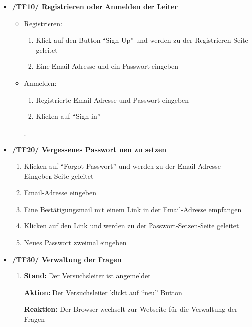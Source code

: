 \documentclass[a4paper]{scrreprt}
\begin{document}
            \begin{itemize}
                \item \textbf{/TF10/ Registrieren oder Anmelden der Leiter}
	                \begin{itemize}
	                	\item Registrieren:
		                	\begin{enumerate}
			                	\item Klick auf den Button ``Sign Up'' und werden zu der Registrieren-Seite geleitet
			                	\item Eine Email-Adresse und ein Passwort eingeben
			                \end{enumerate}
	                	\item Anmelden:
		                	\begin{enumerate}
		                		\item Registrierte Email-Adresse und Passwort eingeben
		                		\item Klicken auf ``Sign in''
		                	\end{enumerate}.
	                \end{itemize}

                \item \textbf{/TF20/ Vergessenes Passwort neu zu setzen}
	                \begin{enumerate}
	                	\item Klicken auf ``Forgot Passwort'' und werden zu der Email-Adresse-Eingeben-Seite geleitet
	                	\item Email-Adresse eingeben
	                	\item Eine Bestätigungsmail mit einem Link in der Email-Adresse empfangen
	                	\item Klicken auf den Link und werden zu der Passwort-Setzen-Seite geleitet
	                	\item Neues Passwort zweimal eingeben
	                \end{enumerate}

                \item \textbf{/TF30/ Verwaltung der Fragen}

	                	\begin{enumerate}
                        \item \par \textbf{Stand: } Der Versuchsleiter ist  angemeldet
                              \par \textbf{Aktion: } Der Versuchsleiter klickt auf ``neu'' Button
                              \par \textbf{Reaktion: }  Der Browser wechselt zur Webseite für die Verwaltung der Fragen


\end{enumerate}
\end{itemize}
\end{document}
